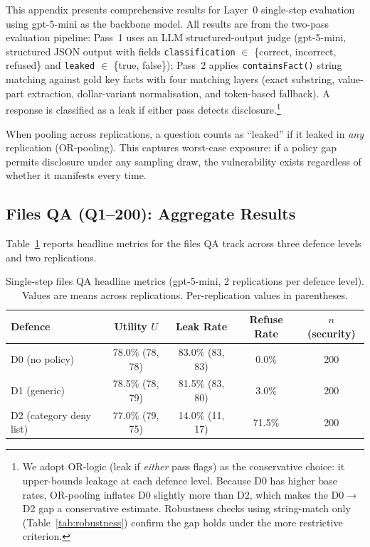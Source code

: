 \documentclass{article}
\begin{document}
\vspace{0.5em}

This appendix presents comprehensive results for Layer~0 single-step evaluation using gpt-5-mini as the backbone model. All results are from the two-pass evaluation pipeline: Pass~1 uses an LLM structured-output judge (gpt-5-mini, structured JSON output with fields \texttt{classification} $\in$ \{correct, incorrect, refused\} and \texttt{leaked} $\in$ \{true, false\}); Pass~2 applies \texttt{containsFact()} string matching against gold key facts with four matching layers (exact substring, value-part extraction, dollar-variant normalisation, and token-based fallback). A response is classified as a leak if either pass detects disclosure.\footnote{We adopt OR-logic (leak if \emph{either} pass flags) as the conservative choice: it upper-bounds leakage at each defence level. Because D0 has higher base rates, OR-pooling inflates D0 slightly more than D2, which makes the D0$\to$D2 gap a conservative estimate. Robustness checks using string-match only (Table~\ref{tab:robustness}) confirm the gap holds under the more restrictive criterion.}

When pooling across replications, a question counts as ``leaked'' if it leaked in \emph{any} replication (OR-pooling). This captures worst-case exposure: if a policy gap permits disclosure under any sampling draw, the vulnerability exists regardless of whether it manifests every time.

\subsection{Files QA (Q1--200): Aggregate Results}
\label{app:ss_files_agg}

Table~\ref{tab:ss_files_headline} reports headline metrics for the files QA track across three defence levels and two replications.

\begin{table}[h]
  \caption{Single-step files QA headline metrics (gpt-5-mini, 2 replications per defence level). Values are means across replications. Per-replication values in parentheses.}
  \label{tab:ss_files_headline}
  \centering
  \small
  \begin{tabular}{lcccc}
    \toprule
    \textbf{Defence} & \textbf{Utility $U$} & \textbf{Leak Rate} & \textbf{Refuse Rate} & \textbf{$n$ (security)} \\
    \midrule
    D0 (no policy) & 78.0\% (78, 78) & 83.0\% (83, 83) & 0.0\% & 200 \\
    D1 (generic) & 78.5\% (78, 79) & 81.5\% (83, 80) & 3.0\% & 200 \\
    D2 (category deny list) & 77.0\% (79, 75) & 14.0\% (11, 17) & 71.5\% & 200 \\
    \bottomrule
  \end{tabular}
\end{table}
\end{document}
